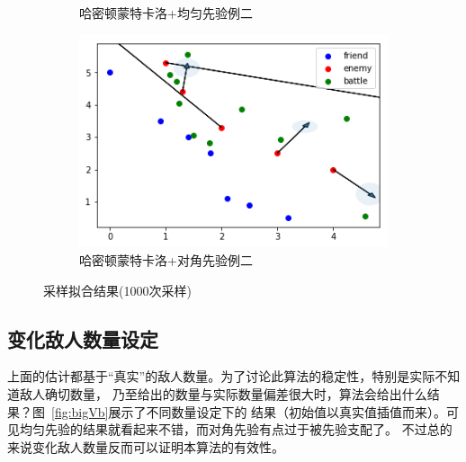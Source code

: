\documentclass{article}
\begin{document}
\begin{figure}[ht]
\begin{subfigure}[b]{0.45\linewidth}
    \caption{哈密顿蒙特卡洛+均匀先验例二}
  \end{subfigure}
  \begin{subfigure}[b]{0.45\linewidth}
    \includegraphics[width=\linewidth]{Sampling42.png}
    \caption{哈密顿蒙特卡洛+对角先验例二}
  \end{subfigure}
  \caption{采样拟合结果(1000次采样)}
  \label{fig:SamplingTen}
\end{figure}

\subsection{变化敌人数量设定}

上面的估计都基于“真实”的敌人数量。为了讨论此算法的稳定性，特别是实际不知道敌人确切数量，
乃至给出的数量与实际数量偏差很大时，算法会给出什么结果？图~\ref{fig:bigVb}展示了不同数量设定下的
结果（初始值以真实值插值而来）。可见均匀先验的结果就看起来不错，而对角先验有点过于被先验支配了。
不过总的来说变化敌人数量反而可以证明本算法的有效性。
\end{document}
